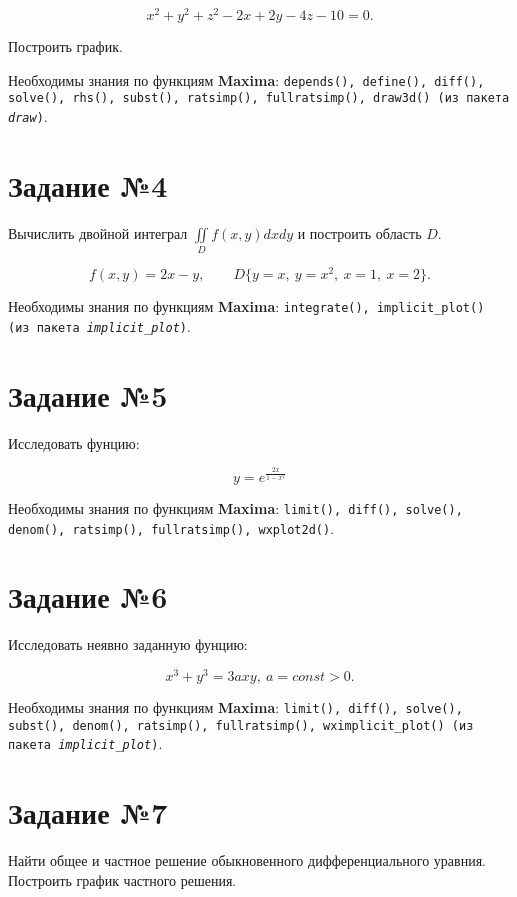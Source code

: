     \[
        x^{2} + y^{2} + z^{2} - 2 x + 2 y - 4 z - 10 = 0.
    \]

    Построить график.

    Необходимы знания по функциям \textbf{Maxima}: {\tt depends(), define(), diff(), solve(), rhs(), subst(), ratsimp(), fullratsimp(), draw3d() (из пакета \textit{draw})}.

\section*{Задание №4}

    Вычислить двойной интеграл $\iint\limits_{D} f(x,y) dx dy$ и построить область $D$.

    \[
        f(x,y) = 2 x - y, \qquad D \{ y = x, \: y = x^{2}, \: x = 1, \: x = 2 \}.
    \]

    Необходимы знания по функциям \textbf{Maxima}: {\tt integrate(), implicit\_plot() (из пакета \textit{implicit\_plot})}.

\section*{Задание №5}

    Исследовать фунцию:

    \[
        y = e^{\frac{2 x}{1 - x^{2}}}
    \]

    Необходимы знания по функциям \textbf{Maxima}: {\tt limit(), diff(), solve(), denom(), ratsimp(), fullratsimp(), wxplot2d()}.

\section*{Задание №6}

    Исследовать неявно заданную фунцию:

    \[
        x^{3} + y^{3} = 3 a x y, \: a = const > 0.
    \]

    Необходимы знания по функциям \textbf{Maxima}: {\tt limit(), diff(), solve(), subst(), denom(), ratsimp(), fullratsimp(), wximplicit\_plot() (из пакета \textit{implicit\_plot})}.

\section*{Задание №7}

    Найти общее и частное решение обыкновенного дифференциального уравния. Построить график частного решения.

